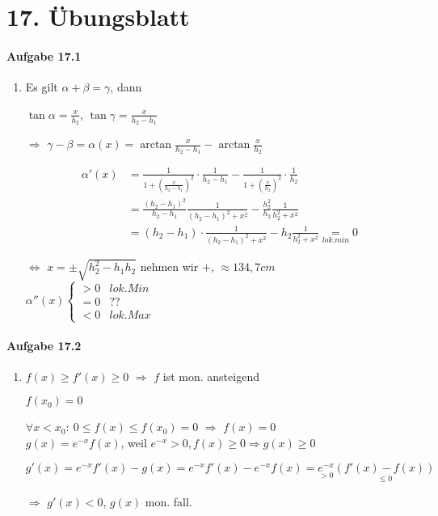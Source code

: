 \section{17. Übungsblatt}

\paragraph{Aufgabe 17.1}

\begin{enumerate}

\item[]

Es gilt $\alpha+\beta=\gamma$, dann

$\tan\alpha=\frac{x}{h_2}$, $\tan\gamma=\frac{x}{h_2-h_1}$

$\Rightarrow$ $\gamma-\beta=\alpha(x)=\arctan\frac{x}{h_2-h_1}-\arctan\frac{x}{h_2}$

\begin{align*}
\alpha'(x)&=\frac{1}{1+(\frac{x}{h_2-h_1})^2}\cdot\frac{1}{h_2-h_1}-\frac{1}{1+(\frac{x}{h_2})^2}\cdot\frac{1}{h_2}\\
&=\frac{(h_2-h_1)^2}{h_2-h_1}\frac{1}{(h_2-h_1)^2+x^2}-\frac{h_2^2}{h_2}\frac{1}{h_2^2+x^2}\\
&=(h_2-h_1)\cdot\frac{1}{(h_2-h_1)^2+x^2}-h_2\frac{1}{h_2^2+x^2}\underset{lok.min}{=}0
\end{align*}

$\Leftrightarrow$ $x=\pm\sqrt{h_2^2-h_1h_2}$ nehmen wir $+$, $\approx134,7cm$\\

$\alpha''(x)
\left\{
\begin{array}{rcl}
>0 & lok.Min\\
=0 & ??\\
<0 & lok.Max 
\end{array}
\right.$

\end{enumerate}

\paragraph{Aufgabe 17.2}

\begin{enumerate}

\item[]

$f(x)\geq f'(x)\geq 0$ $\Rightarrow$ $f$ ist mon. ansteigend

$f(x_0)=0$

$\forall x<x_0:\ 0\leq f(x)\leq f(x_0)=0$ $\Rightarrow$ $f(x)=0$\\

$g(x)=e^{-x}f(x)$, weil $e^{-x}>0,f(x)\geq0\Rightarrow g(x)\geq0$

\begin{equation*}
g'(x)=e^{-x}f'(x)-g(x)=e^{-x}f'(x)-e^{-x}f(x)=\underset{>0}{e^{-x}}\underset{\leq0}{(f'(x)-f(x))}
\end{equation*}

$\Rightarrow$ $g'(x)<0$, $g(x)$ mon. fall.

\end{enumerate}

